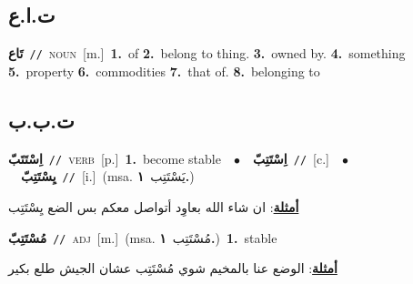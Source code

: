 \documentclass[10pt,a4paper,twoside]{article} %
\begin{document}
\begin{multicols}{2}
\vspace{-3mm}
\subsection*{\color{blue}\foreignlanguage{arabic}{ت.ا.ع}\color{blue}{ (ntws)}} 

{\setlength\topsep{0pt}\textbf{\foreignlanguage{arabic}{تَاع}}\ {\color{gray}\texttt{//}\color{black}}\ \textsc{noun}\ [m.]\ \textbf{1.}~of  \textbf{2.}~belong to thing.  \textbf{3.}~owned by.  \textbf{4.}~something  \textbf{5.}~property  \textbf{6.}~commodities  \textbf{7.}~that of.  \textbf{8.}~belonging to\ } \vspace{2mm}

\vspace{-3mm}
\subsection*{\color{blue}\foreignlanguage{arabic}{ت.ب.ب}\color{blue}{}} 

{\setlength\topsep{0pt}\textbf{\foreignlanguage{arabic}{اِسْتَتَبّ}}\ {\color{gray}\texttt{//}\color{black}}\ \textsc{verb}\ [p.]\ \textbf{1.}~become stable\ \ $\bullet$\ \ \setlength\topsep{0pt}\textbf{\foreignlanguage{arabic}{اِسْتَتِبّ}}\ {\color{gray}\texttt{//}\color{black}}\ [c.]\ \ $\bullet$\ \ \setlength\topsep{0pt}\textbf{\foreignlanguage{arabic}{يِسْتَتِبّ}}\ {\color{gray}\texttt{//}\color{black}}\ [i.]\ \color{gray}(msa. \foreignlanguage{arabic}{يَسْتَتِب}~\foreignlanguage{arabic}{\textbf{١.}})\color{black}\  \begin{flushright}\color{gray}\foreignlanguage{arabic}{\textbf{\underline{\foreignlanguage{arabic}{أمثلة}}}: ان شاء الله بعاوِد أتواصل معكم بس الضع يِسْتَتِب}\end{flushright}\color{black}} \vspace{2mm}

{\setlength\topsep{0pt}\textbf{\foreignlanguage{arabic}{مُسْتَتِبّ}}\ {\color{gray}\texttt{//}\color{black}}\ \textsc{adj}\ [m.]\ \color{gray}(msa. \foreignlanguage{arabic}{مُسْتَتِب}~\foreignlanguage{arabic}{\textbf{١.}})\color{black}\ \textbf{1.}~stable\  \begin{flushright}\color{gray}\foreignlanguage{arabic}{\textbf{\underline{\foreignlanguage{arabic}{أمثلة}}}: الوضع عنا بالمخيم شوي مُسْتَتِب عشان الجيش طلع بكير}\end{flushright}\color{black}} \vspace{2mm}


\end{multicols}
\end{document}

